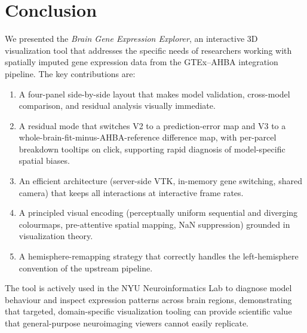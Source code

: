 \documentclass[11pt,letterpaper]{article}
\begin{document}
\section{Conclusion}
\label{sec:conclusion}

We presented the \emph{Brain Gene Expression Explorer}, an interactive
3D visualization tool that addresses the specific needs of researchers
working with spatially imputed gene expression data from the GTEx--AHBA
integration pipeline.
The key contributions are:

\begin{enumerate}[nosep]
  \item A four-panel side-by-side layout that makes model validation,
        cross-model comparison, and residual analysis visually immediate.
  \item A residual mode that switches V2 to a prediction-error map and V3
        to a whole-brain-fit-minus-AHBA-reference difference map, with
        per-parcel breakdown tooltips on click, supporting rapid diagnosis
        of model-specific spatial biases.
  \item An efficient architecture (server-side VTK, in-memory gene switching,
        shared camera) that keeps all interactions at interactive frame rates.
  \item A principled visual encoding (perceptually uniform sequential and
        diverging colourmaps, pre-attentive spatial mapping, NaN suppression)
        grounded in visualization theory.
  \item A hemisphere-remapping strategy that correctly handles the
        left-hemisphere convention of the upstream pipeline.
\end{enumerate}

The tool is actively used in the NYU Neuroinformatics Lab to diagnose
model behaviour and inspect expression patterns across brain regions,
demonstrating that targeted, domain-specific visualization tooling can
provide scientific value that general-purpose neuroimaging viewers
cannot easily replicate.
\end{document}
